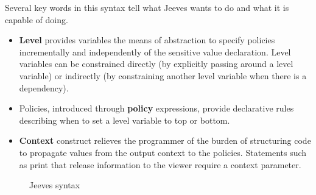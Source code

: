  Several key words in this syntax tell what Jeeves wants to do and what it is capable of doing. 
 \begin{itemize}
 \item \textbf{Level} provides variables the means of abstraction to specify policies incrementally and independently of the sensitive value declaration. Level variables can be constrained directly (by explicitly passing around a level variable) or indirectly (by constraining another level variable when there is a dependency).
 \item Policies, introduced through \textbf{policy} expressions, provide declarative rules describing when to set a level variable to top or bottom.
 \item \textbf{Context} construct relieves the programmer of the burden of structuring code to propagate values from the output context to the policies. Statements such as print that release information to the viewer require a context parameter.
 \end{itemize}
   \begin{figure}[!htbp]
    \caption{Jeeves syntax}
    \label{jeeve-syntax}
\end{figure}
